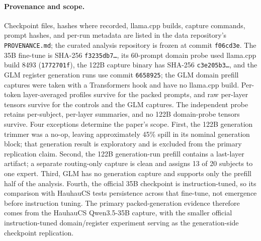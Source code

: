 \paragraph{Provenance and scope.} Checkpoint files, hashes where recorded, llama.cpp builds, capture commands, prompt hashes, and per-run metadata are listed in the data repository's \texttt{PROVENANCE.md}; the curated analysis repository is frozen at commit \texttt{f06cd3e}. The 35B fine-tune is SHA-256 \texttt{f3235db7\ldots}, its 60-prompt domain probe used llama.cpp build 8493 (\texttt{1772701f}), the 122B capture binary has SHA-256 \texttt{c3e205b3\ldots}, and the GLM register generation runs use commit \texttt{6658925}; the GLM domain prefill captures were taken with a Transformers hook and have no llama.cpp build. Per-token layer-averaged profiles survive for the packed prompts, and raw per-layer tensors survive for the controls and the GLM captures. The independent probe retains per-subject, per-layer summaries, and no 122B domain-probe tensors survive. Four exceptions determine the paper's scope. First, the 122B generation trimmer was a no-op, leaving approximately 45\% spill in its nominal generation block; that generation result is exploratory and is excluded from the primary replication claim. Second, the 122B generation-run prefill contains a last-layer artifact; a separate routing-only capture is clean and assigns 13 of 20 subjects to one expert. Third, GLM has no generation capture and supports only the prefill half of the analysis. Fourth, the official 35B checkpoint is instruction-tuned, so its comparison with HauhauCS tests persistence across that fine-tune, not emergence before instruction tuning. The primary packed-generation evidence therefore comes from the HauhauCS Qwen3.5-35B capture, with the smaller official instruction-tuned domain/register experiment serving as the generation-side checkpoint replication.

